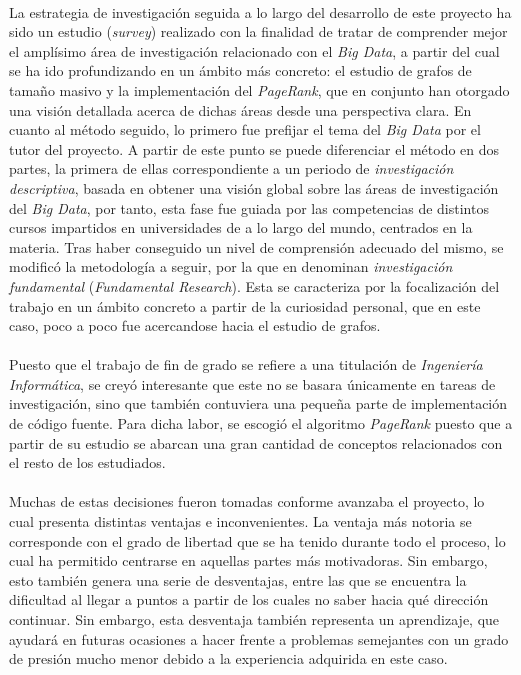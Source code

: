 \documentclass{subfiles}
\begin{document}
    \paragraph{}
    La estrategia de investigación seguida a lo largo del desarrollo de este proyecto ha sido un estudio (\emph{survey}) realizado con la finalidad de tratar de comprender mejor el amplísimo área de investigación relacionado con el \emph{Big Data}, a partir del cual se ha ido profundizando en un ámbito más concreto: el estudio de grafos de tamaño masivo y la implementación del \emph{PageRank}, que en conjunto han otorgado una visión detallada acerca de dichas áreas desde una perspectiva clara. En cuanto al método seguido, lo primero fue prefijar el tema del \emph{Big Data} por el tutor del proyecto. A partir de este punto se puede diferenciar el método en dos partes, la primera de ellas correspondiente a un periodo de \emph{investigación descriptiva}, basada en obtener una visión global sobre las áreas de investigación del \emph{Big Data}, por tanto, esta fase fue guiada por las competencias de distintos cursos impartidos en universidades de a lo largo del mundo, centrados en la materia. Tras haber conseguido un nivel de comprensión adecuado del mismo, se modificó la metodología a seguir, por la que en \cite{haakansson2013portal} denominan \emph{investigación fundamental} (\emph{Fundamental Research}). Esta se caracteriza por la focalización del trabajo en un ámbito concreto a partir de la curiosidad personal, que en este caso, poco a poco fue acercandose hacia el estudio de grafos.

    \paragraph{}
    Puesto que el trabajo de fin de grado se refiere a una titulación de \emph{Ingeniería Informática}, se creyó interesante que este no se basara únicamente en tareas de investigación, sino que también contuviera una pequeña parte de implementación de código fuente. Para dicha labor, se escogió el algoritmo \emph{PageRank} puesto que a partir de su estudio se abarcan una gran cantidad de conceptos relacionados con el resto de los estudiados.

    \paragraph{}
    Muchas de estas decisiones fueron tomadas conforme avanzaba el proyecto, lo cual presenta distintas ventajas e inconvenientes. La ventaja más notoria se corresponde con el grado de libertad que se ha tenido durante todo el proceso, lo cual ha permitido centrarse en aquellas partes más motivadoras. Sin embargo, esto también genera una serie de desventajas, entre las que se encuentra la dificultad al llegar a puntos a partir de los cuales no saber hacia qué dirección continuar. Sin embargo, esta desventaja también representa un aprendizaje, que ayudará en futuras ocasiones a hacer frente a problemas semejantes con un grado de presión mucho menor debido a la experiencia adquirida en este caso.
\end{document}

